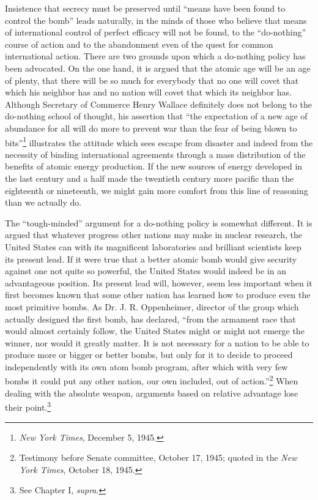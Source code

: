 Insistence that secrecy must be preserved until ``means have been found to control the bomb'' leads naturally, in the minds of those who believe that means of international control of perfect efficacy will not be found, to the ``do-nothing'' course of action and to the abandonment even of the quest for common international action. There are two grounds upon which a do-nothing policy has been advocated. On the one hand, it is argued that the atomic age will be an age of plenty, that there will be so much for everybody that no one will covet that which his neighbor has and no nation will covet that which its neighbor has. Although Secretary of Commerce Henry Wallace definitely does not belong to the do-nothing school of thought, his assertion that ``the expectation of a new age of abundance for all will do more to prevent war than the fear of being blown to bits''\footnote{\textit{New York Times}, December 5, 1945.} illustrates the attitude which sees escape from disaster and indeed from the necessity of binding international agreements through a mass distribution of the benefits of atomic energy production. If the new sources of energy developed in the last century and a half made the twentieth century more pacific than the eighteenth or nineteenth, we might gain more comfort from this line of reasoning than we actually do.

The ``tough-minded'' argument for a do-nothing policy is somewhat different. It is argued that whatever progress other nations may make in nuclear research, the United States can with its magnificent laboratories and brilliant scientists keep its present lead. If it were true that a better atomic bomb would give security against one not quite so powerful, the United States would indeed be in an advantageous position. Its present lead will, however, seem less important when it first becomes known that some other nation has learned how to produce even the most primitive bombs. As Dr. J. R. Oppenheimer, director of the group which actually designed the first bomb, has declared, ``from the armament race that would almost certainly follow, the United States might or might not emerge the winner, nor would it greatly matter. It is not necessary for a nation to be able to produce more or bigger or better bombs, but only for it to decide to proceed independently with its own atom bomb program, after which with very few bombs it could put any other nation, our own included, out of action.''\footnote{Testimony before Senate committee, October 17, 1945; quoted in the \textit{New York Times}, October 18, 1945.} When dealing with the absolute weapon, arguments based on relative advantage lose their point.\footnote{See Chapter I, \textit{supra}.}

